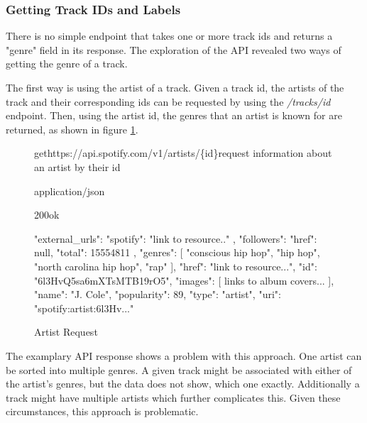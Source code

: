 \subsubsection{Getting Track IDs and Labels}

There is no simple endpoint that takes one or more track ids and returns  a "genre" field
in its response. The exploration of the API revealed two ways of getting the genre of a track. 

The first way is using the artist of a track. Given a track id, the artists of the track and their corresponding
ids can be requested by using the \emph{/tracks/{id}} endpoint. Then, using the artist id, the genres that an
artist is known for are returned, as shown in figure \ref{fig:Artist Request}.

\begin{figure}[H]
    \caption{Artist Request}
	\label{fig:Artist Request}
\begin{apiRoute}{get}{https://api.spotify.com/v1/artists/\{id\}}{request information about an artist by their id}
    \begin{routeParameter}
    \end{routeParameter}
    \begin{routeResponse}{application/json}
        \begin{routeResponseItem}{200}{ok}
            \begin{routeResponseItemBody}
{
    "external_urls": {
        "spotify": "link to resource.."
    },
    "followers": {
        "href": null,
        "total": 15554811
    },
    "genres": [
        "conscious hip hop",
        "hip hop",
        "north carolina hip hop",
        "rap"
    ],
    "href": "link to resource...",
    "id": "6l3HvQ5sa6mXTsMTB19rO5",
    "images": [ links to album covers... ],
    "name": "J. Cole",
    "popularity": 89,
    "type": "artist",
    "uri": "spotify:artist:6l3Hv..."
}
            \end{routeResponseItemBody}
        \end{routeResponseItem}
    \end{routeResponse}
\end{apiRoute}
\end{figure}

The examplary API response shows a problem with this approach. One artist can be sorted
into multiple genres.
A given track might be associated with either of the artist's genres, but the data does
not show, which one exactly.
Additionally a track might have multiple artists which further complicates this.
Given these circumstances, this approach is problematic.

